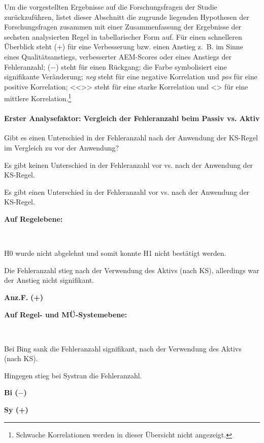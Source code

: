 Um die vorgestellten Ergebnisse auf die Forschungsfragen der Studie zurückzuführen, listet dieser Abschnitt die zugrunde liegenden Hypothesen der Forschungsfragen zusammen mit einer Zusammenfassung der Ergebnisse der sechsten analysierten Regel in tabellarischer Form auf. Für einen schnelleren Überblick steht (+) für eine Verbesserung bzw. einen Anstieg z.~B. im Sinne eines Qualitätsanstiegs, verbesserter AEM-Scores oder eines Anstiegs der Fehleranzahl; ($-$) steht für einen Rückgang; die  Farbe symbolisiert eine signifikante Veränderung; \textit{neg} steht für eine negative Korrelation und \textit{pos} für eine positive Korrelation; <{}<{}>{}> steht für eine starke Korrelation und <> für eine mittlere Korrelation.\footnote{\textrm{Schwache Korrelationen werden in dieser Übersicht nicht angezeigt.}}

\paragraph*{Erster Analysefaktor: Vergleich der Fehleranzahl beim Passiv vs. Aktiv}
\begin{description}[font=\normalfont\bfseries]
\item [Fragestellung:] Gibt es einen Unterschied in der Fehleranzahl nach der Anwendung der KS-Regel im Vergleich zu vor der Anwendung?
\item [H0 --] Es gibt keinen Unterschied in der Fehleranzahl vor vs. nach der Anwendung der KS-Regel.
\item [H1 --] Es gibt einen Unterschied in der Fehleranzahl vor vs. nach der Anwendung der KS-Regel.
\item [Resultat]
\end{description}
\noindent
\parbox[t]{.8\textwidth}{\textbf{Auf Regelebene:}}\\
\parbox[t]{.8\textwidth}{
H0 wurde nicht abgelehnt und somit konnte H1 nicht bestätigt werden.

Die Fehleranzahl stieg nach der Verwendung des Aktivs (nach KS), allerdings war der Anstieg nicht signifikant.
}
\parbox[t]{.04\textwidth}{}
\parbox[t]{.15\textwidth}{
{ \textbf{Anz.F.}} \textbf{(+)}
}

\noindent
\parbox[t]{.8\textwidth}{\textbf{Auf Regel- und MÜ-Systemebene:}}\\
\parbox[t]{.8\textwidth}{
Bei Bing sank die Fehleranzahl signifikant, nach der Verwendung des Aktivs (nach KS).

Hingegen stieg bei Systran die Fehleranzahl.
}
\parbox[t]{.04\textwidth}{}
\colorbox{smGreen}{\parbox[t]{.15\textwidth}{
{ \textbf{Bi ($-$)}}

 \textbf{Sy (+)}\\
}}

